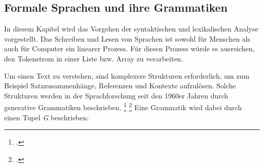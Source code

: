




\pagebreak
   
   
\subsection{Formale Sprachen und ihre Grammatiken}
% 
In diesem Kapitel wird das Vorgehen der syntaktischen und lexikalischen Analyse vorgestellt.
Das Schreiben und Lesen von Sprachen ist sowohl für Menschen als auch für Computer ein linearer Prozess. Für diesen Prozess würde es ausreichen, den Tokenstrom in einer Liste bzw. Array zu verarbeiten.

Um einen Text zu verstehen, sind komplexere Strukturen erforderlich, um zum Beispiel Satzzusammenhänge, Referenzen und Kontexte aufzulösen. Solche Strukturen werden in der Sprachforschung seit den 1960er Jahren durch generative Grammatiken beschrieben. \footcite[Vgl. ][S. 117]{choms} \footcite[Vgl. ][S. 149ff. ]{automata}
Eine Grammatik wird dabei durch einen Tupel \emph{G} beschrieben:

